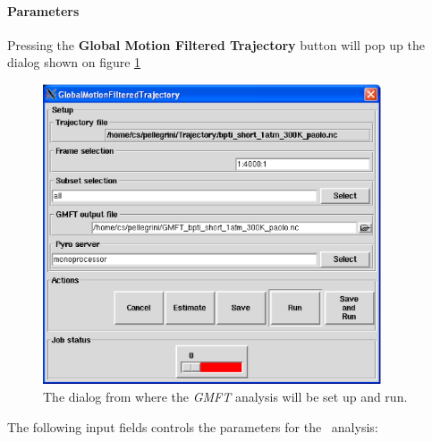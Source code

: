 \documentclass[a4paper,11pt]{report}
\begin{document}
\paragraph{Parameters\\}
\label{gmft_parameters}
Pressing the \textbf{Global Motion Filtered Trajectory} button will pop up the dialog shown on figure \ref{fig:gmft}
\newpage
\begin{figure}[h!]
\begin{center}
\includegraphics[width=10cm]{Figures/gmft.eps}
\end{center}
\caption[The \textit{GMFT} analysis dialog]{The dialog from where the \textit{GMFT} analysis will be set up and run.}
\label{fig:gmft}
\end{figure}   

The following input fields controls the parameters for the \GMFT\ analysis:
\end{document}

